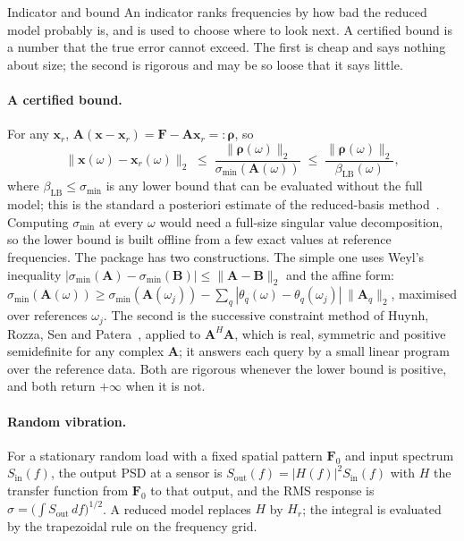 \begin{sidenote}{Indicator and bound}
An indicator ranks frequencies by how bad the reduced model probably is, and is used to choose where to look next. A certified bound is a number that the true error cannot exceed. The first is cheap and says nothing about size; the second is rigorous and may be so loose that it says little.
\end{sidenote}

\paragraph{A certified bound.}
For any $\bm x_r$, $\bm A(\bm x-\bm x_r)=\bm F-\bm A\bm x_r=:\bm\rho$, so
\begin{equation}\label{eq:fr-bound}
\|\bm x(\omega)-\bm x_r(\omega)\|_2\;\le\;\frac{\|\bm\rho(\omega)\|_2}{\sigma_{\min}(\bm A(\omega))}\;\le\;\frac{\|\bm\rho(\omega)\|_2}{\beta_{\mathrm{LB}}(\omega)},
\end{equation}
where $\beta_{\mathrm{LB}}\le\sigma_{\min}$ is any lower bound that can be evaluated without the full model; this is the standard a posteriori estimate of the reduced-basis method~\cite{hesthaven2016rb}. Computing $\sigma_{\min}$ at every $\omega$ would need a full-size singular value decomposition, so the lower bound is built offline from a few exact values at reference frequencies. The package has two constructions. The simple one uses Weyl's inequality $|\sigma_{\min}(\bm A)-\sigma_{\min}(\bm B)|\le\|\bm A-\bm B\|_2$ and the affine form: $\sigma_{\min}(\bm A(\omega))\ge\sigma_{\min}(\bm A(\omega_j))-\sum_q|\theta_q(\omega)-\theta_q(\omega_j)|\,\|\bm A_q\|_2$, maximised over references $\omega_j$. The second is the successive constraint method of Huynh, Rozza, Sen and Patera~\cite{huynh2007scm}, applied to $\bm A^H\bm A$, which is real, symmetric and positive semidefinite for any complex $\bm A$; it answers each query by a small linear program over the reference data. Both are rigorous whenever the lower bound is positive, and both return $+\infty$ when it is not.

\paragraph{Random vibration.}
For a stationary random load with a fixed spatial pattern $\bm F_0$ and input spectrum $S_{\mathrm{in}}(f)$, the output PSD at a sensor is $S_{\mathrm{out}}(f)=|H(f)|^2S_{\mathrm{in}}(f)$ with $H$ the transfer function from $\bm F_0$ to that output, and the RMS response is $\sigma=\bigl(\int S_{\mathrm{out}}\,df\bigr)^{1/2}$. A reduced model replaces $H$ by $H_r$; the integral is evaluated by the trapezoidal rule on the frequency grid.

